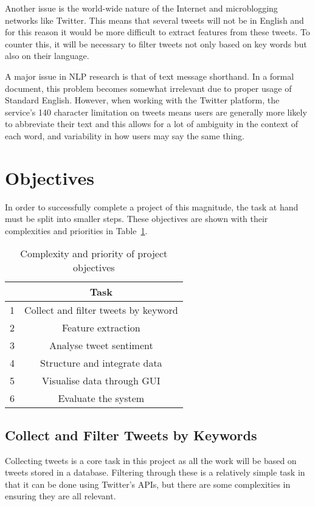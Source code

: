 Another issue is the world-wide nature of the Internet and microblogging networks like Twitter. This means that several tweets will not be in English and for this reason it would be more difficult to extract features from these tweets. To counter this, it will be necessary to filter tweets not only based on key words but also on their language.

A major issue in NLP research is that of text message shorthand. In a formal document, this problem becomes somewhat irrelevant due to proper usage of Standard English. However, when working with the Twitter platform, the service's 140 character limitation on tweets means users are generally more likely to abbreviate their text and this allows for a lot of ambiguity in the context of each word, and variability in how users may say the same thing.

\section{Objectives}
In order to successfully complete a project of this magnitude, the task at hand must be split into smaller steps.  These objectives are shown with their complexities and priorities in Table~\ref{objectives}.

\begin{table}
\begin{center}
\begin{tabular}{|r|c|}\hline\hline
&Task\\\hline
1&Collect and filter tweets by keyword\\
2&Feature extraction\\
3&Analyse tweet sentiment\\
4&Structure and integrate data\\
5&Visualise data through GUI\\
6&Evaluate the system\\\hline\hline
\end{tabular}
\end{center}
\caption{Complexity and priority of project objectives}\label{objectives}
\end{table}

\subsection{Collect and Filter Tweets by Keywords}
Collecting tweets is a core task in this project as all the work will be based on tweets stored in a database. Filtering through these is a relatively simple task in that it can be done using Twitter's APIs, but there are some complexities in ensuring they are all relevant.

